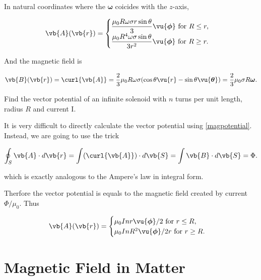 \documentclass[english,a4paper,12pt]{report}
\begin{document}
{In natural coordinates where the \(\boldsymbol{\omega } \) coicides with the \(z\)-axis, 

\begin{equation}
    \vb{A} (\vb{r} ) = \begin{cases}
        \displaystyle \frac{\mu_0 R\omega \sigma r\sin \theta }{3} \vu{\boldsymbol{\phi } } \text{ for } R \le  r,\\
        \displaystyle \frac{\mu_0 R^4 \omega \sigma \sin \theta }{3r^2} \vu{\boldsymbol{\phi } } \text{ for } R \ge r.
    \end{cases}
\end{equation}

And the magnetic field is 

\begin{equation}
    \vb{B} (\vb{r} ) = \curl{\vb{A} } = \frac{2}{3} \mu_0 R \omega \sigma (\cos \theta \vu{r} - \sin \theta \vu{\boldsymbol{\theta } }) = \frac{2}{3} \mu_0 \sigma R \boldsymbol{\omega } .   
\end{equation}
}

{Find the vector potential of an infinite solenoid with \(n\) turns per unit length, radius \(R\) and current I.}
{It is very difficult to directly calculate the vector potential using \cref{magpotential}. Instead, we are going to use the trick

\begin{equation}
    \oint_{S} \vb{A} \cdot d\vb{r} = \int (\curl{\vb{A} } ) \cdot d\vb{S} = \int \vb{B} \cdot d\vb{S} = \Phi .
\end{equation}

which is exactly analogous to the Ampere's law in integral form.

Therfore the vector potential is equals to the magnetic field created by current \(\Phi /\mu_0  \). Thus

\begin{equation}
    \vb{A} (\vb{r} ) = \begin{cases}
        \mu_0 Inr \vu{\boldsymbol{\phi } }/2  \text{ for } r \le R,\\
        \mu_0 InR^2\vu{\boldsymbol{\phi } }/2r  \text{ for } r \ge R.
    \end{cases}
\end{equation}


}

\chapter{Magnetic Field in Matter}
\end{document}
